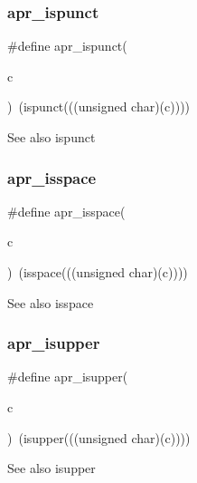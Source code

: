 \subsubsection{\texorpdfstring{apr\+\_\+ispunct}{apr\_ispunct}}
{\footnotesize\ttfamily \#define apr\+\_\+ispunct(\begin{DoxyParamCaption}\item[{}]{c }\end{DoxyParamCaption})~(ispunct(((unsigned char)(c))))}

\begin{DoxySeeAlso}{See also}
ispunct 
\end{DoxySeeAlso}
\mbox{\label{group__apr__ctype_ga23f4c7721923a0f0f444fd7fb196047a}} 
\subsubsection{\texorpdfstring{apr\+\_\+isspace}{apr\_isspace}}
{\footnotesize\ttfamily \#define apr\+\_\+isspace(\begin{DoxyParamCaption}\item[{}]{c }\end{DoxyParamCaption})~(isspace(((unsigned char)(c))))}

\begin{DoxySeeAlso}{See also}
isspace 
\end{DoxySeeAlso}
\mbox{\label{group__apr__ctype_ga362f53cc44aab662aaf04fa87e36035b}} 
\subsubsection{\texorpdfstring{apr\+\_\+isupper}{apr\_isupper}}
{\footnotesize\ttfamily \#define apr\+\_\+isupper(\begin{DoxyParamCaption}\item[{}]{c }\end{DoxyParamCaption})~(isupper(((unsigned char)(c))))}

\begin{DoxySeeAlso}{See also}
isupper 
\end{DoxySeeAlso}
\mbox{\label{group__apr__ctype_ga9d30f3c5d538c21c6d50565cda8654d0}} 
